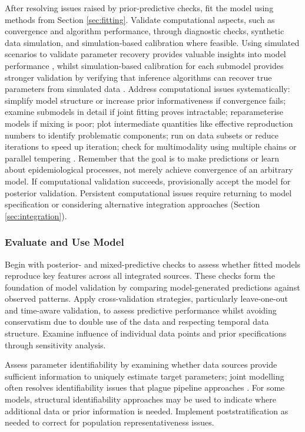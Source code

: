 \documentclass{article}
\begin{document}
After resolving issues raised by prior-predictive checks, fit the model using methods from Section \ref{sec:fitting}.
Validate computational aspects, such as convergence and algorithm performance, through diagnostic checks, synthetic data simulation, and simulation-based calibration where feasible.
Using simulated scenarios to validate parameter recovery provides valuable insights into model performance \citep{bouman2024bayesian}, whilst simulation-based calibration for each submodel provides stronger validation by verifying that inference algorithms can recover true parameters from simulated data \citep{talts2018validating}.
Address computational issues systematically: simplify model structure or increase prior informativeness if convergence fails; examine submodels in detail if joint fitting proves intractable; reparameterise models if mixing is poor; plot intermediate quantities like effective reproduction numbers to identify problematic components; run on data subsets or reduce iterations to speed up iteration; check for multimodality using multiple chains or parallel tempering \citep{gelman2020bayesian}.
Remember that the goal is to make predictions or learn about epidemiological processes, not merely achieve convergence of an arbitrary model. 
If computational validation succeeds, provisionally accept the model for posterior validation.
Persistent computational issues require returning to model specification or considering alternative integration approaches (Section \ref{sec:integration}).

\subsubsection{Evaluate and Use Model}

Begin with posterior- and mixed-predictive checks \citep{rubin1984bayesianly,gelman1995bayesian} to assess whether fitted models reproduce key features across all integrated sources.
These checks form the foundation of model validation by comparing model-generated predictions against observed patterns.
Apply cross-validation strategies, particularly leave-one-out and time-aware validation, to assess predictive performance whilst avoiding conservatism due to double use of the data and respecting temporal data structure.
Examine influence of individual data points and prior specifications through sensitivity analysis.

Assess parameter identifiability by examining whether data sources provide sufficient information to uniquely estimate target parameters; joint modelling often resolves identifiability issues that plague pipeline approaches \citep{lison2024generative, russell2024combined}.
For some models, structural identifiability approaches \citep{jackson2019value,heath2024value} may be used to indicate where additional data or prior information is needed.
Implement poststratification as needed to correct for population representativeness issues.
\end{document}
